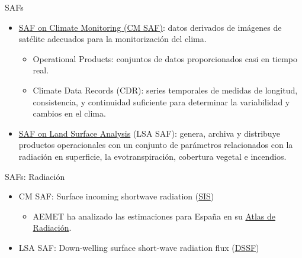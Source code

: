 \documentclass[aspectratio=169, usenames,svgnames,dvipsnames]{beamer}
\begin{document}
\begin{frame}[label={sec:org13a8d35}]{SAFs}
\begin{itemize}
\item \href{https://wui.cmsaf.eu/safira/action/viewProduktSearch}{SAF on Climate Monitoring (CM SAF)}: datos derivados de imágenes de satélite adecuados para la monitorización del clima.

\begin{itemize}
\item Operational Products: conjuntos de datos proporcionados casi en tiempo real.

\item Climate Data Records (CDR): series temporales de medidas de longitud, consistencia, y continuidad suficiente para determinar la variabilidad y cambios en el clima.
\end{itemize}

\item \href{https://landsaf.ipma.pt/en/}{SAF on Land Surface Analysis} (LSA SAF): genera, archiva y distribuye productos operacionales con un conjunto de parámetros relacionados con la radiación en superficie, la evotranspiración, cobertura vegetal e incendios.
\end{itemize}
\end{frame}

\begin{frame}[label={sec:org1ffc400}]{SAFs: Radiación}
\begin{itemize}
\item \alert{CM SAF}: Surface incoming shortwave radiation (\href{https://wui.cmsaf.eu/safira/action/viewProduktDetails?eid=21987\_21988\&fid=27}{SIS})

\begin{itemize}
\item AEMET ha analizado las estimaciones para España en su \href{http://www.aemet.es/es/serviciosclimaticos/datosclimatologicos/atlas\_radiacion\_solar}{Atlas de Radiación}.
\end{itemize}

\item \alert{LSA SAF}: Down-welling surface short-wave radiation flux (\href{https://landsaf.ipma.pt/en/products/longwave-shortwave-radiation/dssf/}{DSSF})
\end{itemize}
\end{frame}
\end{document}
